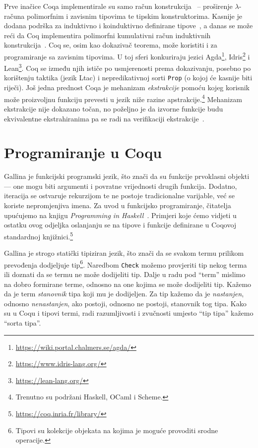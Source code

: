 Prve inačice Coqa implementirale su samo račun konstrukcija~\cite{coc} --
proširenje \(\lambda\)-računa polimorfnim i zavisnim tipovima te tipskim konstruktorima.
Kasnije je dodana podrška za induktivno i koinduktivno definirane tipove~\cite{cic, coinductive},
a danas se može reći da Coq implementira polimorfni kumulativni račun induktivnih konstrukcija~\cite{coqcoqcorrect}.
Coq se, osim kao dokazivač teorema, može koristiti i za programiranje sa zavisnim tipovima.
U toj sferi konkuriraju jezici Agda\footnote{\url{https://wiki.portal.chalmers.se/agda/}}, Idris\footnote{\url{https://www.idris-lang.org/}} i Lean\footnote{\url{https://lean-lang.org/}}. Coq se između njih ističe po usmjerenosti prema dokazivanju, posebno po korištenju taktika (jezik Ltac) i nepredikativnoj sorti \texttt{Prop} (o kojoj će kasnije biti riječi).
Još jedna prednost Coqa je mehanizam \textit{ekstrakcije} pomoću kojeg korisnik može proizvoljnu funkciju prevesti u jezik niže razine apstrakcije.\footnote{Trenutno su podržani Haskell, OCaml i Scheme.}
Mehanizam ekstrakcije nije dokazano točan, no poželjno je da izvorne funkcije budu ekvivalentne ekstrahiranima pa se radi na verifikaciji ekstrakcije~\cite{coqcoqcorrect}.

\section{Programiranje u Coqu}\label{sec:programiranje-u-gallini}
Gallina je funkcijski programski jezik, što znači da su funkcije prvoklasni objekti ---
one mogu biti argumenti i povratne vrijednosti drugih funkcija.
Dodatno, iteracija se ostvaruje rekurzijom te ne postoje tradicionalne varijable, već se koriste nepromjenjiva  imena.
Za uvod u funkcijsko programiranje, čitatelja upućujemo na knjigu \textit{Programming in Haskell}~\cite{Hutton_2016}.
Primjeri koje ćemo vidjeti u ostatku ovog odjeljka oslanjanju se na tipove i funkcije definirane u Coqovoj standardnoj knjižnici.\footnote{\url{https://coq.inria.fr/library/}}

Gallina je strogo statički tipiziran jezik, što znači da se svakom termu prilikom prevođenja dodjeljuje tip\footnote{Tipovi su kolekcije objekata na kojima je moguće provoditi srodne operacije.}.
Naredbom \texttt{Check} možemo provjeriti tip nekog terma ili doznati da se termu ne može dodijeliti tip.
Dalje u radu pod \enquote{term} mislimo na dobro formirane terme, odnosno na one kojima se može dodijeliti tip.
Kažemo da je term \textit{stanovnik} tipa koji mu je dodijeljen.
Za tip kažemo da je \textit{nastanjen}, odnosno \textit{nenastanjen}, ako postoji, odnosno ne postoji, stanovnik tog tipa.
Kako su u Coqu i tipovi termi, radi razumljivosti i zvučnosti umjesto \enquote{tip tipa} kažemo \enquote{sorta tipa}.


